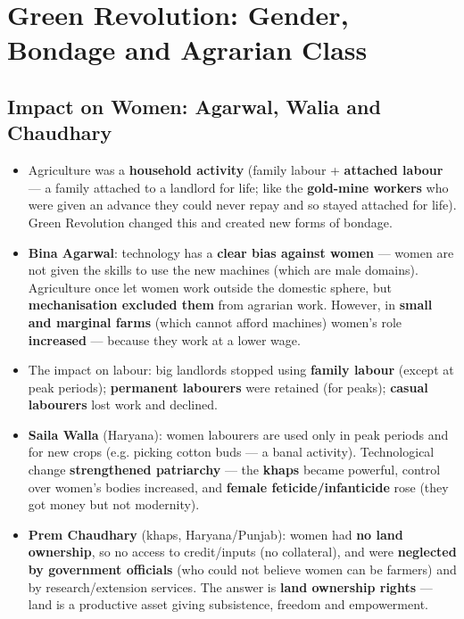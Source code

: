\chapter{Green Revolution: Gender, Bondage and Agrarian Class}

\section{Impact on Women: Agarwal, Walia and Chaudhary}

\begin{KeyConcept}
\begin{itemize}
\item Agriculture was a \textbf{household activity} (family labour + \textbf{attached labour} --- a family attached to a landlord for life; like the \textbf{gold-mine workers} who were given an advance they could never repay and so stayed attached for life). Green Revolution changed this and created new forms of bondage.
\item \textbf{Bina Agarwal}: technology has a \textbf{clear bias against women} --- women are not given the skills to use the new machines (which are male domains). Agriculture once let women work outside the domestic sphere, but \textbf{mechanisation excluded them} from agrarian work. However, in \textbf{small and marginal farms} (which cannot afford machines) women's role \textbf{increased} --- because they work at a lower wage.
\item The impact on labour: big landlords stopped using \textbf{family labour} (except at peak periods); \textbf{permanent labourers} were retained (for peaks); \textbf{casual labourers} lost work and declined.
\item \textbf{Saila Walla} (Haryana): women labourers are used only in peak periods and for new crops (e.g. picking cotton buds --- a banal activity). Technological change \textbf{strengthened patriarchy} --- the \textbf{khaps} became powerful, control over women's bodies increased, and \textbf{female feticide/infanticide} rose (they got money but not modernity).
\item \textbf{Prem Chaudhary} (khaps, Haryana/Punjab): women had \textbf{no land ownership}, so no access to credit/inputs (no collateral), and were \textbf{neglected by government officials} (who could not believe women can be farmers) and by research/extension services. The answer is \textbf{land ownership rights} --- land is a productive asset giving subsistence, freedom and empowerment.
\end{itemize}
\end{KeyConcept}

